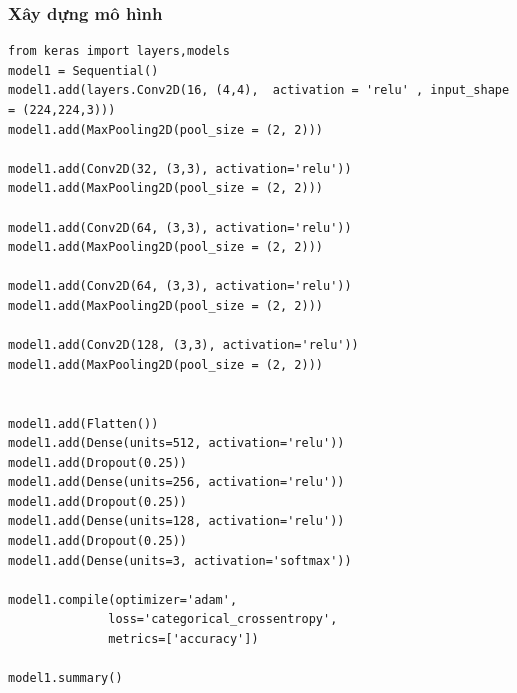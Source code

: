 \subsubsection{Xây dựng mô hình}
\begin{lstlisting}
from keras import layers,models
model1 = Sequential()
model1.add(layers.Conv2D(16, (4,4),  activation = 'relu' , input_shape = (224,224,3)))
model1.add(MaxPooling2D(pool_size = (2, 2)))

model1.add(Conv2D(32, (3,3), activation='relu'))
model1.add(MaxPooling2D(pool_size = (2, 2)))

model1.add(Conv2D(64, (3,3), activation='relu'))
model1.add(MaxPooling2D(pool_size = (2, 2)))

model1.add(Conv2D(64, (3,3), activation='relu'))
model1.add(MaxPooling2D(pool_size = (2, 2)))

model1.add(Conv2D(128, (3,3), activation='relu'))
model1.add(MaxPooling2D(pool_size = (2, 2)))


model1.add(Flatten())
model1.add(Dense(units=512, activation='relu'))
model1.add(Dropout(0.25))
model1.add(Dense(units=256, activation='relu'))
model1.add(Dropout(0.25))
model1.add(Dense(units=128, activation='relu'))
model1.add(Dropout(0.25))
model1.add(Dense(units=3, activation='softmax'))

model1.compile(optimizer='adam',
              loss='categorical_crossentropy',
              metrics=['accuracy'])

model1.summary()
\end{lstlisting}
\newpage
